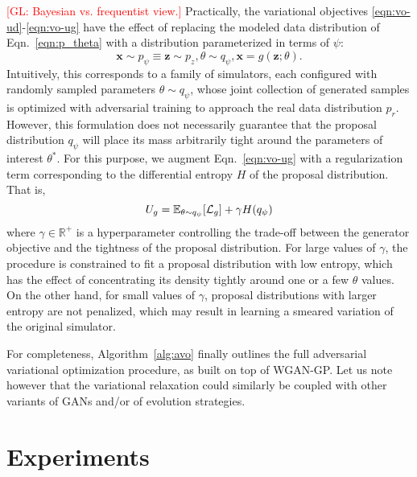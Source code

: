 \documentclass[twocolumn,superscriptaddress,aps]{revtex4-1}
\newcommand{\glnote}[1]{\textcolor{red}{[GL: #1]}}
\theoremstyle{plain}
\begin{document}
\glnote{Bayesian vs. frequentist view.}
Practically, the variational objectives \ref{eqn:vo-ud}-\ref{eqn:vo-ug}
have the effect of replacing the modeled data distribution of Eqn.~\ref{eqn:p_theta} with
a distribution parameterized in terms of $\psi$:
\begin{equation}\label{eqn:p_psi}
    \mathbf{x} \sim p_\psi \equiv \mathbf{z} \sim p_z, \theta \sim q_\psi, \mathbf{x} = g(\mathbf{z}; \theta).
\end{equation}
Intuitively, this corresponds to a family of simulators, each configured
with randomly sampled parameters $\theta \sim q_\psi$, whose joint collection
of generated samples is optimized with adversarial training to approach the real data distribution $p_r$.
However, this formulation does not necessarily guarantee that the
proposal distribution $q_\psi$ will place its mass arbitrarily tight
around the parameters of interest $\theta^*$. For this purpose, we augment Eqn.~\ref{eqn:vo-ug}
with a regularization term corresponding to the differential entropy $H$ of
the proposal distribution. That is,
\begin{equation}
    U_g = \mathbb{E}_{\theta \sim q_\psi} [ {\cal L}_g ] + \gamma H(q_\psi)
\end{equation}
where $\gamma \in \mathbb{R}^+$ is a hyperparameter controlling the trade-off
between the generator objective and the tightness of the proposal distribution.
For large values of $\gamma$, the procedure is constrained to fit a proposal
distribution with low entropy, which has the effect of concentrating its density
tightly around one or a few $\theta$ values. On the other hand, for small values of $\gamma$,
proposal distributions with larger entropy are not penalized, which may result
in learning a smeared variation of the original simulator.

For completeness, Algorithm~\ref{alg:avo} finally outlines the full adversarial variational
optimization procedure, as built on top of WGAN-GP.
Let us note however that the variational relaxation could similarly be coupled with
other variants of GANs and/or of evolution strategies.






\section{Experiments}
\end{document}
